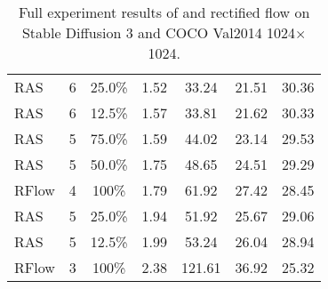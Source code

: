 \begin{table*}[th]
\begin{tabular}{lcccccc}
RAS & 6 & 25.0\% & 1.52 & 33.24 & 21.51 & 30.36 \\
RAS & 6 & 12.5\% & 1.57 & 33.81 & 21.62 & 30.33 \\

RAS & 5 & 75.0\% & 1.59 & 44.02 & 23.14 & 29.53 \\
RAS & 5 & 50.0\% & 1.75 & 48.65 & 24.51 & 29.29 \\
\rowcolor{gray!10}
RFlow & 4 & 100\% & 1.79 & 61.92 & 27.42 & 28.45 \\
RAS & 5 & 25.0\% & 1.94 & 51.92 & 25.67 & 29.06 \\
RAS & 5 & 12.5\% & 1.99 & 53.24 & 26.04 & 28.94 \\

\rowcolor{gray!10}
RFlow & 3 & 100\% & 2.38 & 121.61 & 36.92 & 25.32 \\
\hline
\end{tabular}
\caption{Full experiment results of \ourmethod{} and rectified flow on Stable Diffusion 3 and COCO Val2014 1024$\times$1024.}
\label{tab:sd3_app}
\end{table*}

\clearpage







